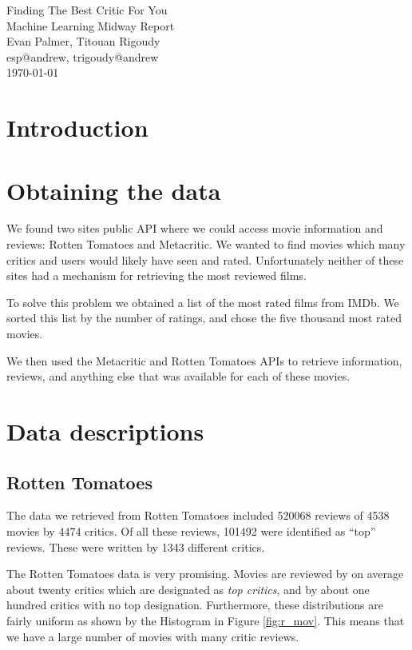 \documentclass[12pt]{article}
\makeatletter
\newcommand{\myname}{Evan Palmer, Titouan Rigoudy}
\newcommand{\myandrew}{esp@andrew, trigoudy@andrew}
\newcommand{\thedate}{\today}
\makeatother
\begin{document}
	\medskip    
	\thispagestyle{plain}
	\begin{center}                 
	{\LARGE Finding The Best Critic For You} \\
	\medskip
	Machine Learning Midway Report \\
	\smallskip
	\myname \\
	\myandrew \\
	\thedate \\
	\end{center}
	\vspace{0.5cm}

\section{Introduction}

\section{Obtaining the data}

	We found two sites public API where we could access movie information and reviews: Rotten Tomatoes and Metacritic. We wanted to find movies which many critics and users would likely have seen and rated. Unfortunately neither of these sites had a mechanism for retrieving the most reviewed films. 

	To solve this problem we obtained a list of the most rated films from IMDb. We sorted this list by the number of ratings, and chose the five thousand most rated movies. 

	We then used the Metacritic and Rotten Tomatoes APIs to retrieve information, reviews, and anything else that was available for each of these movies.

\section{Data descriptions}

\subsection{Rotten Tomatoes}

	The data we retrieved from Rotten Tomatoes included 520068 reviews of 4538 movies by 4474 critics. Of all these reviews, 101492 were identified as ``top'' reviews. These were written by 1343 different critics.

	The Rotten Tomatoes data is very promising. Movies are reviewed by on average about twenty critics which are designated as \textit{top critics}, and by about one hundred critics with no top designation. Furthermore, these distributions are fairly uniform as shown by the Histogram in Figure \ref{fig:r_mov}. This means that we have a large number of movies with many critic reviews.
\end{document}
